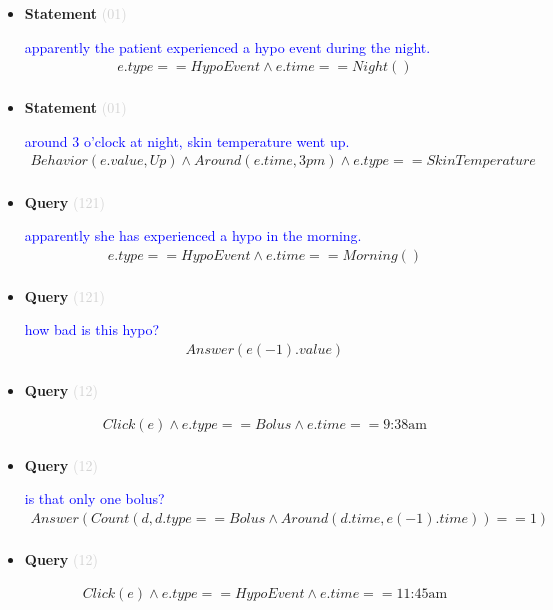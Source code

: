 \documentclass[11pt]{article}
\newcommand{\key}[1]{\textcolor{lightgray}{#1}}
\newcounter{CQuery}
\newcounter{CStatement}
\begin{document}
\begin{itemize}
\item
\textbf{Statement\theCStatement} \key{(01)} \addtocounter{CStatement}{1}
\textcolor{blue}{ apparently the patient experienced a hypo event during the night. }
\begin{multline*}
e.type==HypoEvent \wedge e.time==Night() \\ 
\end{multline*}


\item
\textbf{Statement\theCStatement} \key{(01)} \addtocounter{CStatement}{1}
\textcolor{blue}{ around 3 o'clock at night, skin temperature went up. }
\begin{multline*}
Behavior(e.value, Up) \wedge Around(e.time, 3pm) \wedge e.type==SkinTemperature \\ 
\end{multline*}


\item
\textbf{Query\theCQuery} \key{(121)} \addtocounter{CQuery}{1}
\textcolor{blue}{ apparently she has experienced a hypo in the morning. }
\begin{multline*}
e.type==HypoEvent \wedge e.time==Morning() \\ 
\end{multline*}


\item
\textbf{Query\theCQuery} \key{(121)} \addtocounter{CQuery}{1}
\textcolor{blue}{ how bad is this hypo? }
\begin{multline*}
Answer(e(-1).value) \\ 
\end{multline*}


\item
\textbf{Query\theCQuery} \key{(12)} \addtocounter{CQuery}{1}
\textcolor{blue}{  }
\begin{multline*}
Click(e) \wedge e.type == Bolus \wedge e.time==\mbox{9:38am} \\ 
\end{multline*}


\item
\textbf{Query\theCQuery} \key{(12)} \addtocounter{CQuery}{1}
\textcolor{blue}{ is that only one bolus? }
\begin{multline*}
Answer(Count(d, d.type==Bolus \wedge Around(d.time, e(-1).time))==1) \\ 
\end{multline*}


\item
\textbf{Query\theCQuery} \key{(12)} \addtocounter{CQuery}{1}
\textcolor{blue}{  }
\begin{multline*}
Click(e) \wedge e.type == HypoEvent \wedge e.time == \mbox{11:45am} \\ 
\end{multline*}



\end{itemize}
\end{document}
